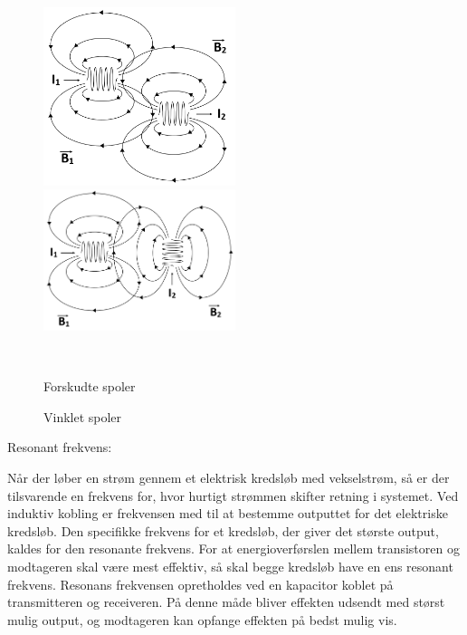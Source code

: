 \begin{figure}[H]
	\centering
	\begin{minipage}[b]{0.48\textwidth}
	\centering
	\includegraphics[width=0.5\textwidth]{Vildledning/Schematics/forskudt_spole} %
	\end{minipage}
	\hfill
	\begin{minipage}[b]{0.48\textwidth}
	\centering
	\includegraphics[width=0.5\textwidth]{Vildledning/Schematics/vinklet_spole} %
	\end{minipage}
	\\ %
	\begin{minipage}[t]{0.48\textwidth}
	\caption{Forskudte spoler} %
	\label{fspoler}
	\end{minipage}
	\hfill
	\begin{minipage}[t]{0.48\textwidth}
	\caption{Vinklet spoler} %
	\label{vspoler}
	\end{minipage}
\end{figure}

Resonant frekvens:

Når der løber en strøm gennem et elektrisk kredsløb med vekselstrøm, så er der tilsvarende en frekvens for, hvor hurtigt strømmen skifter retning i systemet. Ved induktiv kobling er frekvensen med til at bestemme outputtet for det elektriske kredsløb. Den specifikke frekvens for et kredsløb, der giver det største output, kaldes for den resonante frekvens. For at energioverførslen mellem transistoren og modtageren skal være mest effektiv, så skal begge kredsløb have en ens resonant frekvens. Resonans frekvensen opretholdes ved en kapacitor koblet på transmitteren og receiveren. På denne måde bliver effekten udsendt med størst mulig output, og modtageren kan opfange effekten på bedst mulig vis.

